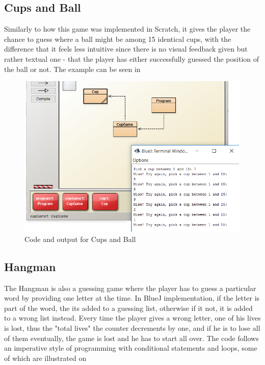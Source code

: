 \subsection{Cups and Ball}
Similarly to how this game was implemented in Scratch, it gives the player the chance to guess where a ball might be among 15 identical cups, with the difference that it feels less intuitive since there is no visual feedback given but rather textual one - that the player has either successfully guessed the position of the ball or not. The example can be seen in  

\begin{figure}[!h]
  \centering
      \includegraphics[scale=0.7]{./pics/bluej_ballcup_code}
      \caption{Code and output for Cups and Ball}
      \label{fig:bluej_ballcup_code} 
\end{figure}

\subsection{Hangman}
The Hangman is also a guessing game where the player has to guess a particular word by providing one letter at the time. In BlueJ implementation, if the letter is part of the word, the its added to a guessing list, otherwise if it not, it is added to a wrong list instead. Every time the player gives a wrong letter, one of his lives is lost, thus the "total lives" the counter decrements by one, and if he is to lose all of them eventually, the game is lost and he has to start all over. The code follows an imperative style of programming with conditional statements and loops, some of which are illustrated on  

